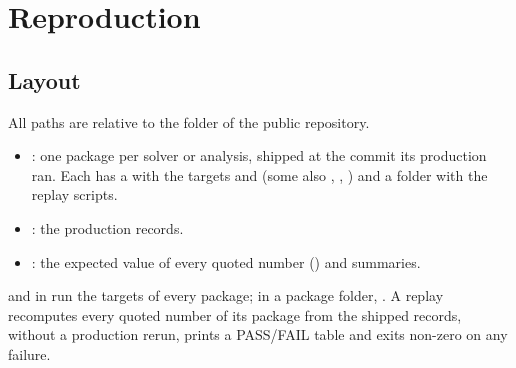 \section{Reproduction}\label{htp:sec:repro}

\subsection{Layout}
All paths are relative to the folder  of the public repository.
\begin{itemize}
\item {}: one package per solver or analysis, shipped at the commit its production ran. Each has a
  with the targets  and  (some also , ,
 ) and a  folder with the replay scripts.
\item {}: the production records.
\item {}: the expected value of every quoted number () and summaries.
\end{itemize}
 and  in  run the targets of every package; in a package folder,
. A replay recomputes every quoted number of its package from the shipped records,
without a production rerun, prints a PASS/FAIL table and exits non-zero on any failure.

